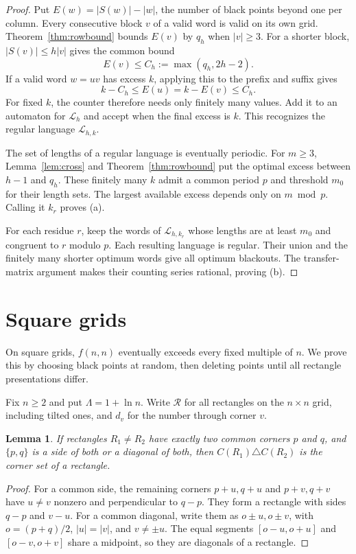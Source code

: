 \documentclass[12pt]{article}
\theoremstyle{plain}
\newtheorem{lemma}[theorem]{Lemma}
\theoremstyle{definition}
\theoremstyle{remark}
\begin{document}
\begin{proof}
Put $E(w)=|S(w)|-|w|$, the number of black points beyond one per column.
Every consecutive block $v$ of a valid word is valid on its own grid.
Theorem~\ref{thm:rowbound} bounds $E(v)$ by $q_h$ when $|v|\ge3$.
For a shorter block, $|S(v)|\le h|v|$ gives the common bound
\[
 E(v)\le C_h:=\max(q_h,2h-2).
\]
If a valid word $w=uv$ has excess $k$, applying this to the prefix and
suffix gives
\[
 k-C_h\le E(u)=k-E(v)\le C_h.
\]
For fixed $k$, the counter therefore needs only finitely many values.
Add it to an automaton for $\mathcal L_h$ and accept when the final excess
is $k$. This recognizes the regular language $\mathcal L_{h,k}$.

The set of lengths of a regular language is eventually periodic. For
$m\ge3$, Lemma~\ref{lem:cross} and Theorem~\ref{thm:rowbound} put the
optimal excess between $h-1$ and $q_h$. These finitely many
$k$ admit a common period $p$ and threshold $m_0$ for their length sets.
The largest available excess depends only on $m\bmod p$.
Calling it $k_r$ proves (a).

For each residue $r$, keep the words of $\mathcal L_{h,k_r}$ whose lengths
are at least $m_0$ and congruent to $r$ modulo $p$. Each resulting language is regular.
Their union and the finitely many shorter optimum words give all optimum
blackouts. The transfer-matrix argument makes their counting series
rational, proving (b).
\end{proof}
\section{Square grids}\label{sec:square}

On square grids, $f(n,n)$ eventually exceeds every fixed multiple of $n$.
We prove this by choosing black points at random, then deleting points
until all rectangle presentations differ.

Fix $n\ge2$ and put $\Lambda=1+\ln n$.
Write $\mathcal R$ for all rectangles on the $n\times n$ grid,
including tilted ones, and $d_v$ for the number through corner $v$.

\begin{lemma}\label{lem:compress}
If rectangles $R_1\ne R_2$ have exactly two common corners $p$ and $q$, and $\{p,q\}$ is a side of both or a diagonal of both, then $C(R_1)\triangle C(R_2)$ is the corner set of a rectangle.
\end{lemma}

\begin{proof}
For a common side, the remaining corners $p+u,q+u$ and $p+v,q+v$
have $u\ne v$ nonzero and perpendicular to $q-p$. They form a
rectangle with sides $q-p$ and $v-u$.
For a common diagonal, write them as $o\pm u,o\pm v$, with
$o=(p+q)/2$, $|u|=|v|$, and $v\ne\pm u$.
The equal segments $[o-u,o+u]$ and $[o-v,o+v]$ share a midpoint,
so they are diagonals of a rectangle.
\end{proof}
\end{document}
